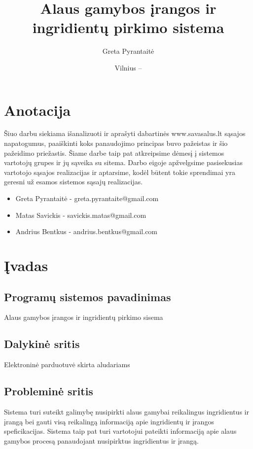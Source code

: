 \documentclass[oneside]{VUMIFPSkursinis}
\title{Alaus gamybos įrangos ir ingridientų pirkimo sistema}
\author{Greta Pyrantaitė}
\date{Vilnius – \the\year}
\begin{document}
\maketitle

\section{Anotacija}
Šiuo darbu siekiama išanalizuoti ir aprašyti dabartinės www.savasalus.lt sąsajos napatogumus, paaiškinti koks panaudojimo principas buvo pažeistas ir šio pažeidimo priežastis.
Šiame darbe taip pat atkreipsime dėmesį į sistemos vartotojų grupes ir jų sąveika su sitema.
Darbo eigoje apžvelgsime pasisekusias vartotojo sąsajos realizacijas ir aptarsime, kodėl būtent tokie sprendimai yra geresni už esamos sistemos sąsajų realizacijas.

\begin{itemize}
	\item{Greta Pyrantaitė - greta.pyrantaite@gmail.com}
	\item{Matas Savickis - savickis.matas@gmail.com}
	\item{Andrius Bentkus - andrius.bentkus@gmail.com}
\end{itemize}

\tableofcontents

\section{Įvadas}
	\subsection{Programų sistemos pavadinimas}
		Alaus gamybos įrangos ir ingridientų pirkimo sisema
	\subsection{Dalykinė sritis}
		Elektroninė parduotuvė skirta aludariams
	\subsection{Probleminė sritis}
		Sistema turi suteikt galimybę nusipirkti alaus gamybai reikalingus ingridientus ir įrangą bei gauti visą reikalingą informaciją apie ingridientų ir įrangos speficikacijas.
		Sistema taip pat turi vartotojui pateikti informaciją apie alaus gamybos procesą panaudojant nusipirktus ingridientus ir įrangą.
\end{document}
